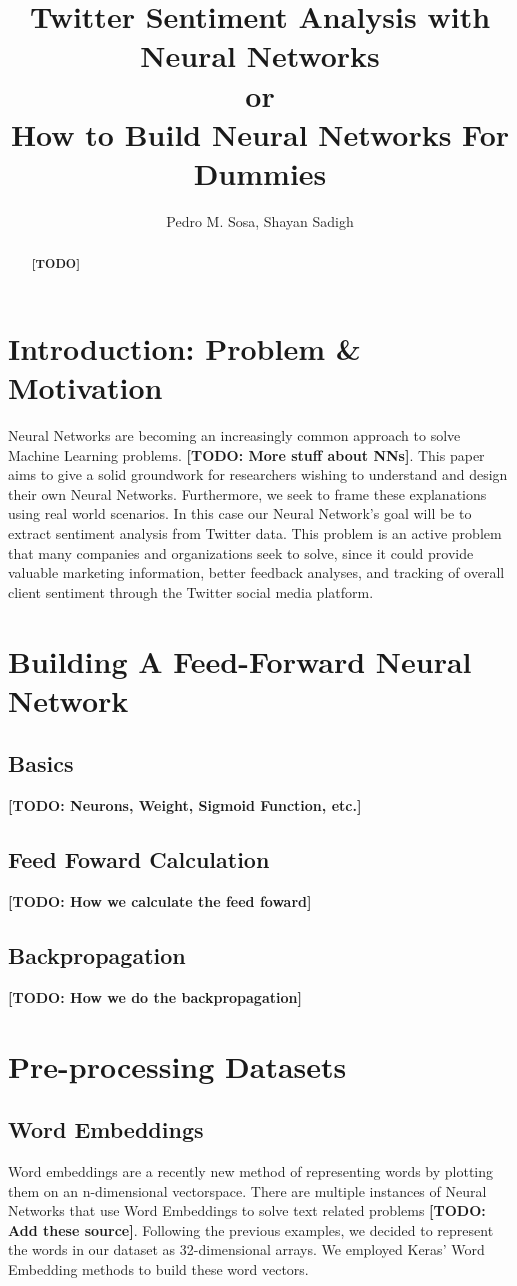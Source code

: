 \documentclass[11pt,onecolumn]{article} %
\title{Twitter Sentiment Analysis with Neural Networks\\or\\ How to Build Neural Networks For Dummies}
\author{Pedro M. Sosa, Shayan Sadigh}
\begin{document}
\maketitle

\begin{abstract}
\textbf{[TODO]}
\end{abstract}

\section{Introduction: Problem \& Motivation}
Neural Networks are becoming an increasingly common approach to solve Machine Learning problems. \textbf{[TODO: More stuff about NNs]}. This paper aims to give a solid groundwork for researchers wishing to understand and design their own Neural Networks. Furthermore, we seek to frame these explanations using real world scenarios. In this case our Neural Network's goal will be to extract sentiment analysis from Twitter data. This problem is an active problem that many companies and organizations seek to solve, since it could provide valuable marketing information, better feedback analyses, and tracking of overall client sentiment through the Twitter social media platform.


\section{Building A Feed-Forward Neural Network}
\subsection{Basics}
\textbf{[TODO: Neurons, Weight, Sigmoid Function, etc.]}
\subsection{Feed Foward Calculation}
\textbf{[TODO: How we calculate the feed foward]}
\subsection{Backpropagation}
\textbf{[TODO: How we do the backpropagation]}

\section{Pre-processing Datasets}
\subsection{Word Embeddings}
Word embeddings are a recently new method of representing words by plotting them on an n-dimensional vectorspace. There are multiple instances of Neural Networks that use Word Embeddings to solve text related problems \textbf{[TODO: Add these source]}. Following the previous examples, we decided to represent the words in our dataset as 32-dimensional arrays. We employed Keras' Word Embedding methods to build these word vectors.
\end{document}
